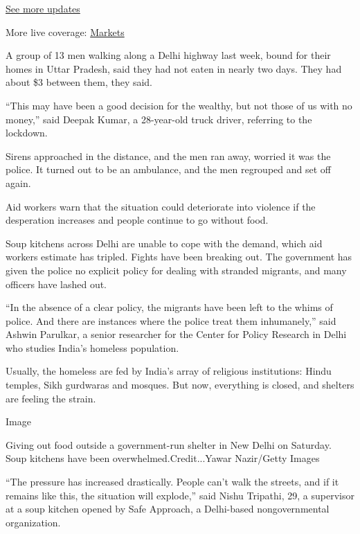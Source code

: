 \href{https://www.nytimes.com/2020/08/01/world/coronavirus-covid-19.html?action=click\&pgtype=Article\&state=default\&region=MAIN_CONTENT_1\&context=storylines_live_updates}{See
more updates}

More live coverage:
\href{https://www.nytimes.com/live/2020/07/31/business/stock-market-today-coronavirus?action=click\&pgtype=Article\&state=default\&region=MAIN_CONTENT_1\&context=storylines_live_updates}{Markets}

A group of 13 men walking along a Delhi highway last week, bound for
their homes in Uttar Pradesh, said they had not eaten in nearly two
days. They had about \$3 between them, they said.

``This may have been a good decision for the wealthy, but not those of
us with no money,'' said Deepak Kumar, a 28-year-old truck driver,
referring to the lockdown.

Sirens approached in the distance, and the men ran away, worried it was
the police. It turned out to be an ambulance, and the men regrouped and
set off again.

Aid workers warn that the situation could deteriorate into violence if
the desperation increases and people continue to go without food.

Soup kitchens across Delhi are unable to cope with the demand, which aid
workers estimate has tripled. Fights have been breaking out. The
government has given the police no explicit policy for dealing with
stranded migrants, and many officers have lashed out.

``In the absence of a clear policy, the migrants have been left to the
whims of police. And there are instances where the police treat them
inhumanely,'' said Ashwin Parulkar, a senior researcher for the Center
for Policy Research in Delhi who studies India's homeless population.

Usually, the homeless are fed by India's array of religious
institutions: Hindu temples, Sikh gurdwaras and mosques. But now,
everything is closed, and shelters are feeling the strain.

Image

Giving out food outside a government-run shelter in New Delhi on
Saturday. Soup kitchens have been overwhelmed.Credit...Yawar Nazir/Getty
Images

``The pressure has increased drastically. People can't walk the streets,
and if it remains like this, the situation will explode,'' said Nishu
Tripathi, 29, a supervisor at a soup kitchen opened by Safe Approach, a
Delhi-based nongovernmental organization.

